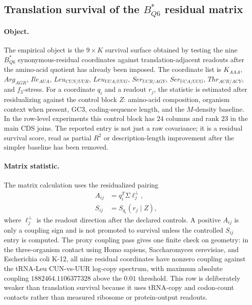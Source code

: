 \subsection{Translation survival of the $B^{*}_{Q6}$ residual matrix}
\label{sec:bioreality-translation-survival-b-star-q6-survival-matrix}

\paragraph{Object.}
The empirical object is the $9 \times K$ survival surface obtained by testing the nine $B^{*}_{Q6}$ synonymous-residual coordinates against translation-adjacent readouts after the amino-acid quotient has already been imposed.  The coordinate list is
$K_{AAA}$, $Arg_{AGR}$, $Ile_{AUA}$, $Leu_{CUN/UUR}$, $Leu_{UUA/UUG}$, $Ser_{UCR/AGY}$, $Ser_{UCA/UCG}$, $Thr_{ACR/ACY}$, and $f_3$-stress.  For a coordinate $q_i$ and a readout $r_j$, the statistic is estimated after residualizing against the control block $Z$: amino-acid composition, organism context when present, GC3, coding-sequence length, and the $M$-density baseline.  In the row-level experiments this control block has $24$ columns and rank $23$ in the main CDS joins.  The reported entry is not just a raw covariance; it is a residual survival score, read as partial $R^2$ or description-length improvement after the simpler baseline has been removed.

\paragraph{Matrix statistic.}
The matrix calculation uses the residualized pairing
$$
\begin{aligned}
A_{ij} &= q_i^{T}\Sigma\ell_j^{\perp},\\
S_{ij} &= S_{q_i}(r_j\mid Z),
\end{aligned}
$$
where $\ell_j^{\perp}$ is the readout direction after the declared controls.  A positive $A_{ij}$ is only a coupling sign and is not promoted to survival unless the controlled $S_{ij}$ entry is computed.  The proxy coupling pass gives one finite check on geometry: in the three-organism contact using Homo sapiens, Saccharomyces cerevisiae, and Escherichia coli K-12, all nine residual coordinates have nonzero coupling against the tRNA-Leu CUN-vs-UUR log-copy spectrum, with maximum absolute coupling $1882464.1106377328$ above the $0.01$ threshold.  This row is deliberately weaker than translation survival because it uses tRNA-copy and codon-count contacts rather than measured ribosome or protein-output readouts.

